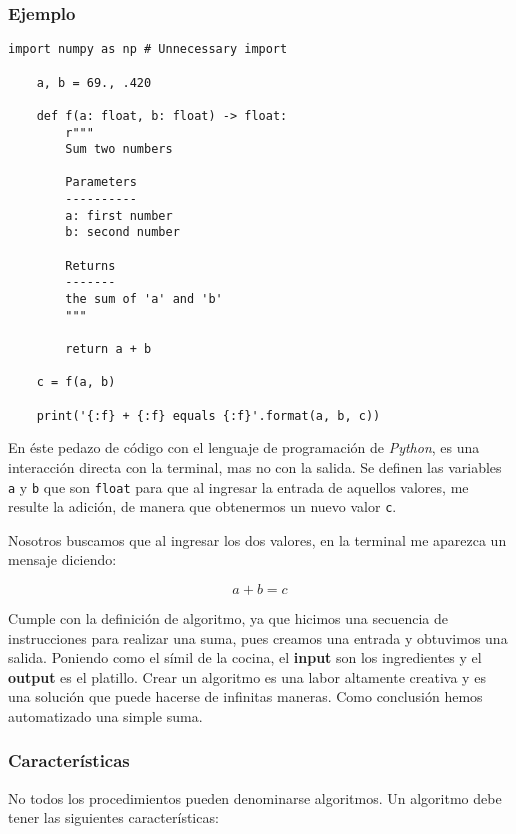 \subsubsection{Ejemplo}


    \begin{lstlisting}[style=pythonFrameTB, gobble=4]
    import numpy as np # Unnecessary import

    a, b = 69., .420

    def f(a: float, b: float) -> float:
        r"""
        Sum two numbers

        Parameters
        ----------
        a: first number
        b: second number

        Returns
        -------
        the sum of 'a' and 'b'
        """

        return a + b

    c = f(a, b)

    print('{:f} + {:f} equals {:f}'.format(a, b, c))
    \end{lstlisting}

En éste pedazo de código con el lenguaje de programación de \textit{Python}, es una interacción directa con la terminal, mas no con la salida. Se definen las variables \texttt{a} y \texttt{b} que son \texttt{float} para que al ingresar la entrada de aquellos valores, me resulte la adición, de manera que obtenermos un nuevo valor \texttt{c}.

Nosotros buscamos que al ingresar los dos valores, en la terminal me aparezca un mensaje diciendo:

\begin{equation}
    a+b=c
\end{equation}

Cumple con la definición de algoritmo, ya que hicimos una secuencia de instrucciones para realizar una suma, pues creamos una entrada y obtuvimos una salida. Poniendo como el símil de la cocina, el \textbf{input} son los ingredientes y el \textbf{output} es el platillo. Crear un algoritmo es una labor altamente creativa y es una solución que puede hacerse de infinitas maneras. Como conclusión hemos automatizado una simple suma.


\subsubsection{Características}

No todos los procedimientos pueden denominarse algoritmos. Un algoritmo debe tener las siguientes características:

